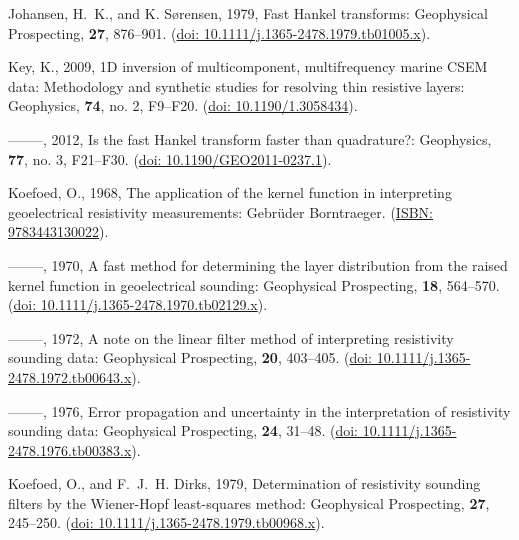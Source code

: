 \documentclass[a4paper, twoside, parskip, 10pt]{scrartcl}
\begin{document}
\begin{multicols}{2}
\begin{thebibliography}{}
Johansen, H.~K., and K. Sørensen,  1979, Fast {H}ankel transforms: Geophysical
  Prospecting, {\bf 27}, 876--901.
\newblock (\href{https://doi.org/10.1111/j.1365-2478.1979.tb01005.x}{doi:
  10.1111/j.1365-2478.1979.tb01005.x}).

Key, K.,  2009, {1D} inversion of multicomponent, multifrequency marine {CSEM}
  data: {M}ethodology and synthetic studies for resolving thin resistive
  layers: Geophysics, {\bf 74}, no. 2, F9--F20.
\newblock (\href{https://doi.org/10.1190/1.3058434}{doi: 10.1190/1.3058434}).

--------, 2012, Is the fast {H}ankel transform faster than quadrature?:
  Geophysics, {\bf 77}, no. 3, F21--F30.
\newblock (\href{https://doi.org/10.1190/GEO2011-0237.1}{doi:
  10.1190/GEO2011-0237.1}).

Koefoed, O.,  1968, The application of the kernel function in interpreting
  geoelectrical resistivity measurements: Gebrüder Borntraeger.
\newblock (\href{https://isbnsearch.org/isbn/9783443130022}{{I}SBN:
  9783443130022}).

--------, 1970, A fast method for determining the layer distribution from the
  raised kernel function in geoelectrical sounding: Geophysical Prospecting,
  {\bf 18}, 564--570.
\newblock (\href{https://doi.org/10.1111/j.1365-2478.1970.tb02129.x}{doi:
  10.1111/j.1365-2478.1970.tb02129.x}).

--------, 1972, A note on the linear filter method of interpreting resistivity
  sounding data: Geophysical Prospecting, {\bf 20}, 403--405.
\newblock (\href{https://doi.org/10.1111/j.1365-2478.1972.tb00643.x}{doi:
  10.1111/j.1365-2478.1972.tb00643.x}).

--------, 1976, Error propagation and uncertainty in the interpretation of
  resistivity sounding data: Geophysical Prospecting, {\bf 24}, 31--48.
\newblock (\href{https://doi.org/10.1111/j.1365-2478.1976.tb00383.x}{doi:
  10.1111/j.1365-2478.1976.tb00383.x}).

Koefoed, O., and F.~J.~H. Dirks,  1979, Determination of resistivity sounding
  filters by the {W}iener-{H}opf least-squares method: Geophysical Prospecting,
  {\bf 27}, 245--250.
\newblock (\href{https://doi.org/10.1111/j.1365-2478.1979.tb00968.x}{doi:
  10.1111/j.1365-2478.1979.tb00968.x}).


\end{thebibliography}
\end{multicols}
\end{document}
